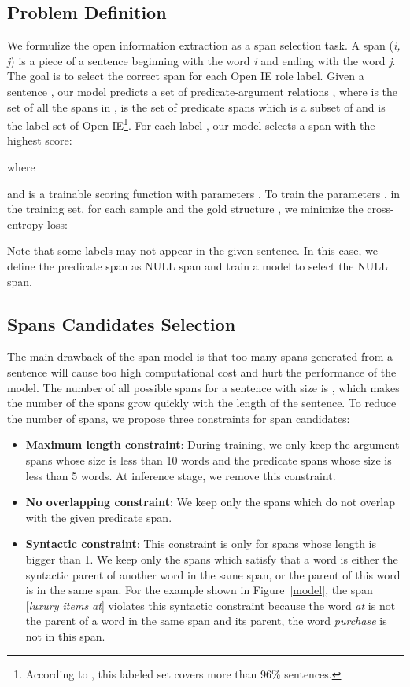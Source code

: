 \documentclass[letterpaper]{article} \usepackage{aaai20}  \usepackage{times}  \usepackage{helvet} \usepackage{courier}  \usepackage[hyphens]{url}  \urlstyle{rm} \def\UrlFont{\rm}  \usepackage{graphicx}  \frenchspacing  \setlength{\pdfpagewidth}{8.5in}  \setlength{\pdfpageheight}{11in}
\begin{document}
\subsection{Problem Definition}
We formulize the open information extraction as a span selection task. A span (\textit{i, j}) is a piece of a sentence beginning with the word \textit{i} and ending with the word \textit{j}. The goal is to select the correct span for each Open IE role label. Given a sentence , our model predicts a set of predicate-argument relations , where  is the set of all the spans in ,  is the set of predicate spans which is a subset of  and  is the label set of Open IE\footnote{According to \cite{Stanovsky2018SupervisedOI}, this labeled set covers more than 96\% sentences.}. For each label , our model selects a span  with the highest score:

where

and  is a trainable scoring function with parameters . To train the parameters , in the training set, for each sample  and the gold structure , we minimize the cross-entropy loss:


Note that some labels may not appear in the given sentence. In this case, we define the predicate span as NULL span and train a model to select the NULL span.

\subsection{Spans Candidates Selection}
The main drawback of the span model is that too many spans generated from a sentence will cause too high computational cost and hurt the performance of the model. The number of all possible spans for a sentence with size  is , which makes the number of the spans grow quickly with the length of the sentence. To reduce the number of spans, we propose three constraints for span candidates:
\begin{itemize}
\item {\textbf{Maximum length constraint}}: During training, we only keep the argument spans whose size is less than 10 words and the predicate spans whose size is less than 5 words. At inference stage, we remove this constraint.
\item {\textbf{No overlapping constraint}}:  We keep only the spans which do not overlap with the given predicate span.
\item {\textbf{Syntactic constraint}}: This constraint is only for spans whose length is bigger than 1. We keep only the spans which satisfy that a word is either the syntactic parent of another word in the same span, or the parent of this word is in the same span. For the example shown in Figure~\ref{model}, the span [\emph{luxury items at}] violates this syntactic constraint because the word \emph{at} is not the parent of a word in the same span and its parent, the word \emph{purchase} is not in this span.
\end{itemize}
\end{document}
